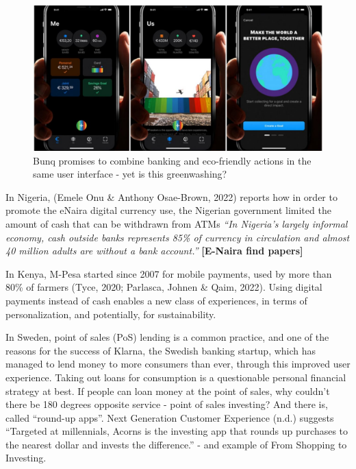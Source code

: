\documentclass[
  letterpaper,
  DIV=11,
  numbers=noendperiod]{scrartcl}
\begin{document}
\begin{figure}[H]

{\centering \includegraphics[width=1\linewidth,height=\textheight,keepaspectratio]{./images/finance/bunq.jpg}

}

\caption{Bunq promises to combine banking and eco-friendly actions in
the same user interface - yet is this greenwashing?}

\end{figure}%

In Nigeria, (Emele Onu \& Anthony Osae-Brown, 2022) reports how in order
to promote the eNaira digital currency use, the Nigerian government
limited the amount of cash that can be withdrawn from ATMs \emph{``In
Nigeria's largely informal economy, cash outside banks represents 85\%
of currency in circulation and almost 40 million adults are without a
bank account.''} \textbf{{[}E-Naira find papers{]}}

In Kenya, M-Pesa started since 2007 for mobile payments, used by more
than 80\% of farmers (Tyce, 2020; Parlasca, Johnen \& Qaim, 2022). Using
digital payments instead of cash enables a new class of experiences, in
terms of personalization, and potentially, for sustainability.

In Sweden, point of sales (PoS) lending is a common practice, and one of
the reasons for the success of Klarna, the Swedish banking startup,
which has managed to lend money to more consumers than ever, through
this improved user experience. Taking out loans for consumption is a
questionable personal financial strategy at best. If people can loan
money at the point of sales, why couldn't there be 180 degrees opposite
service - point of sales investing? And there is, called ``round-up
apps''. Next Generation Customer Experience (n.d.) suggests ``Targeted
at millennials, Acorns is the investing app that rounds up purchases to
the nearest dollar and invests the difference.'' - and example of From
Shopping to Investing.
\end{document}
